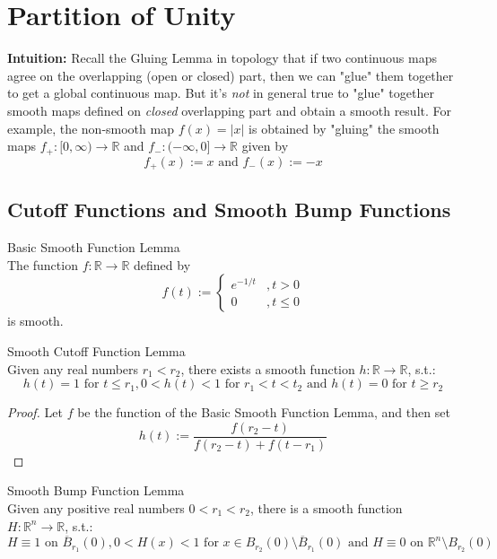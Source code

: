 \chapter{Partition of Unity}

\noindent\textbf{Intuition:} Recall the Gluing Lemma in topology that if two continuous maps agree on the overlapping (open or closed) part, then we can "glue" them together to get a global continuous map. But it's \textit{not} in general true to "glue" together smooth maps defined on \textit{closed} overlapping part and obtain a smooth result. For example, the non-smooth map $f(x)=|x|$ is obtained by "gluing" the smooth maps $f_+: [0,\infty) \to \mathbb{R}$ and $f_-: (-\infty, 0]\to \mathbb{R}$ given by
\[
f_+(x):= x \text{ and } f_-(x):= -x
\]

\section{Cutoff Functions and Smooth Bump Functions}

\begin{lemma}{Basic Smooth Function Lemma}\\
The function $f:\mathbb{R} \to \mathbb{R}$ defined by
\[
f(t):= \begin{cases}
    e^{-1/t} &,t>0\\
    0&,t\leq 0
\end{cases}
\]
is smooth.
\end{lemma}

\begin{lemma}{Smooth Cutoff Function Lemma}\\
Given any real numbers $r_1<r_2$, there exists a smooth function $h:\mathbb{R} \to \mathbb{R}$, s.t.:
\[
h(t)=1 \text{ for } t\leq r_1, 0<h(t)<1 \text{ for } r_1<t<t_2 \text{ and } h(t)=0 \text{ for } t\geq r_2
\]
\end{lemma}

\begin{proof}
    Let $f$ be the function of the Basic Smooth Function Lemma, and then set
    \[
    h(t):= \frac{f(r_2-t)}{f(r_2-t)+ f(t-r_1)}
    \]
\end{proof}

\begin{lemma}{Smooth Bump Function Lemma}\\
Given any positive real numbers $0<r_1<r_2$, there is a smooth function $H:\mathbb{R}^n \to \mathbb{R}$, s.t.:
\[
H\equiv 1 \text{ on } \overline{B}_{r_1} (0), 0<H(x)<1 \text{ for } x\in B_{r_2} (0) \setminus \overline{B}_{r_1} (0) \text{ and } H\equiv 0 \text{ on } \mathbb{R}^n \setminus B_{r_2} (0)
\]
\end{lemma}

